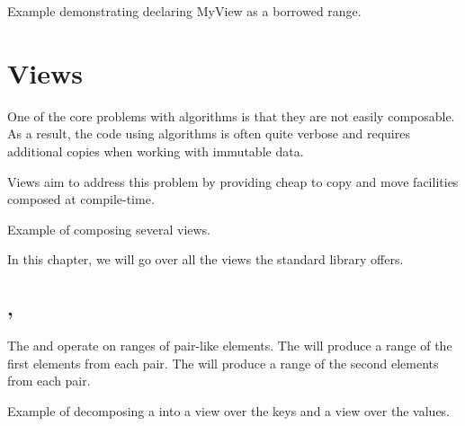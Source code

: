 \begin{box-note}
\footnotesize Example demonstrating declaring MyView as a borrowed range.
\tcblower
{}
\end{box-note}

\section{Views}

One of the core problems with algorithms is that they are not easily composable. As a result, the code using algorithms is often quite verbose and requires additional copies when working with immutable data.

Views aim to address this problem by providing cheap to copy and move facilities composed at compile-time.

\begin{box-note}
\footnotesize Example of composing several views.
\tcblower
{}
\end{box-note}

In this chapter, we will go over all the views the standard library offers.

\subsection{\texorpdfstring{, }{\texttt{std::views::keys}, \texttt{std::views::values}}}

The  and  operate on ranges of pair-like elements.
The  will produce a range of the first elements from each pair.
The  will produce a range of the second elements from each pair.

\begin{box-note}
\footnotesize Example of decomposing a  into a view over the keys and a view over the values.
\tcblower
{}
\end{box-note}

\subsection{\texorpdfstring{}{\texttt{std::views::elements}}}

